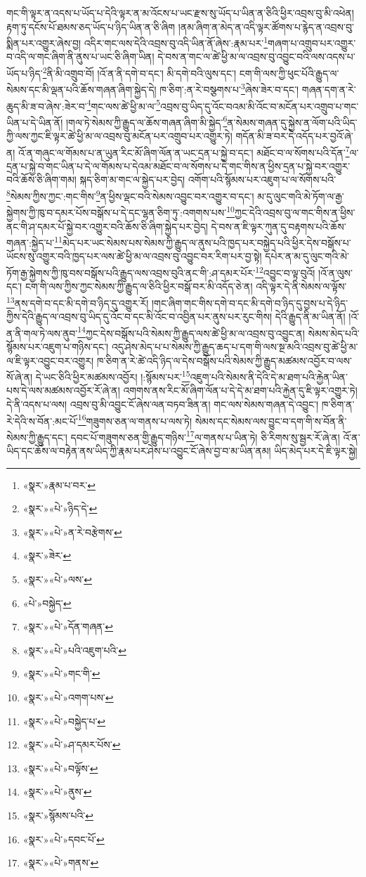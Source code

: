 གང་གི་ལྟར་ན་འདས་པ་ཡོད་པ་དེའི་ལྟར་ན་མ་འོངས་པ་ཡང་རྫས་སུ་ཡོད་པ་ཡིན་ན་ཅིའི་ཕྱིར་འབྲས་བུ་མི་འཕེན། རྟག་ཏུ་དངོས་པོ་ཐམས་ཅད་ཡོད་པ་ཉིད་ཡིན་ན་ཅི་ཞིག །ནམ་ཞིག་ན་མེད་ན་འདི་ལྟར་ཚོགས་པ་རྙེད་ན་འབྲས་བུ་སྨིན་པར་འགྱུར་ཞེས་བྱ། འདིར་གང་ལས་དེའི་འབྲས་བུ་འདི་ཡིན་ནོ་ཞེས་:རྣམ་པར་\footnote{«སྣར་»རྣམ་པ་བར་}གཞག་པ་འགྲུབ་པར་འགྱུར་བ་འདི་ལ་གང་ཞིག་ནི་ནུས་པ་ཡང་ཅི་ཞིག་ཡིན། དེ་བས་ན་གང་ལ་ཚེ་ཕྱི་མ་ལ་འབྲས་བུ་འབྱུང་བའི་ལས་འདས་པ་ཡོད་པ་ཉིད་\footnote{«སྣར་»«པེ་»ཉིད་དེ་}ནི་མི་འགྲུབ་བོ། །འོ་ན་ནི་དགེ་བ་དང་། མི་དགེ་བའི་ལུས་དང་། ངག་གི་ལས་ཀྱི་ཕུང་པོའི་རྒྱུད་ལ་སེམས་དང་མི་ལྡན་པའི་ཆོས་གཞན་ཞིག་སྐྱེད་དེ། ཁ་ཅིག་:ན་རེ་བསྩགས་པ་\footnote{«སྣར་»«པེ་»ན་རེ་བརྩེགས་}ཞེས་ཟེར་བ་དང་། གཞན་དག་ན་རེ་ཆུད་མི་ཟ་བ་ཞེས་:ཟེར་བ་\footnote{«སྣར་»ཟེར་}གང་ལས་ཚེ་ཕྱི་མ་ལ་\footnote{«སྣར་»«པེ་»ལས་}འབྲས་བུ་ཡིད་དུ་འོང་བའམ་མི་འོང་བ་མངོན་པར་འགྲུབ་པ་གང་ཡིན་པ་དེ་ཡིན་ནོ། །གལ་ཏེ་སེམས་ཀྱི་རྒྱུད་ལ་ཆོས་གཞན་ཞིག་མི་སྐྱེད་\footnote{«པེ་»བསྐྱེད་}ན་སེམས་གཞན་དུ་སྐྱེས་ན་ལོག་པའི་ཡིད་ཀྱི་ལས་ཀྱང་ཇི་ལྟར་ཚེ་ཕྱི་མ་ལ་འབྲས་བུ་མངོན་པར་འགྲུབ་པར་འགྱུར་ཏེ། གདོན་མི་ཟ་བར་དེ་འདོད་པར་བྱའོ་ཞེ་ན། འོ་ན་གཞུང་ལ་གོམས་པ་ན་ཡུན་རིང་མོ་ཞིག་ལོན་ན་ཡང་དྲན་པ་སྐྱེ་བ་དང་། མཐོང་བ་ལ་སོགས་པའི་དོན་\footnote{«སྣར་»«པེ་»དོན་གཞན་}ལ་དྲན་པ་སྐྱེ་བ་གང་ཡིན་པ་དེ་ལ་གོམས་པ་དེའམ་མཐོང་བ་ལ་སོགས་པ་དེ་གང་གིས་ན་ཕྱིས་དྲན་པ་སྐྱེ་བར་འགྱུར་བའི་ཆོས་ཅི་ཞིག་གམ། སྐད་ཅིག་མ་གང་ལ་སྐྱེད་པར་བྱེད། འགོག་པའི་སྙོམས་པར་འཇུག་པ་ལ་སོགས་པའི་\footnote{«སྣར་»«པེ་»པའི་འཇུག་པའི་}སེམས་ཀྱིས་ཀྱང་:གང་གིས་\footnote{«སྣར་»«པེ་»གང་གི་}ན་ཕྱིས་ལྡང་བའི་སེམས་འབྱུང་བར་འགྱུར་བ་དང་། མ་དུ་ལུང་གའི་མེ་ཏོག་ལ་རྒྱ་སྐྱེགས་ཀྱི་ཁུ་བ་དམར་པོས་བསྒོས་པ་དེ་དང་ལྷན་ཅིག་ཏུ་:འགགས་པས་\footnote{«སྣར་»«པེ་»འགག་པས་}ཀྱང་དེའི་འབྲས་བུ་ལ་གང་གིས་ན་ཕྱིས་ནང་གི་ཤ་དམར་པོ་སྐྱེ་བར་འགྱུར་བའི་ཆོས་ཅི་ཞིག་སྐྱེད་པར་བྱེད། དེ་བས་ན་ཇི་ལྟར་ཀུན་དུ་བརྟགས་པའི་ཆོས་གཞན་:སྐྱེད་པ་\footnote{«སྣར་»«པེ་»བསྐྱེད་པ་}མེད་པར་ཡང་སེམས་པས་སེམས་ཀྱི་རྒྱུད་ལ་ནུས་པའི་ཁྱད་པར་བསྐྱེད་པའི་ཕྱིར་དེས་བསྒོས་པ་ཡོངས་སུ་འགྱུར་བའི་ཁྱད་པར་ལས་ཚེ་ཕྱི་མ་ལ་འབྲས་བུ་འབྱུང་བར་རིག་པར་བྱ་སྟེ། དཔེར་ན་མ་དུ་ལུང་གའི་མེ་ཏོག་རྒྱ་སྐྱེགས་ཀྱི་ཁུ་བས་བསྒོས་པའི་རྒྱུད་ལས་འབྲས་བུའི་ནང་གི་:ཤ་དམར་པོར་\footnote{«སྣར་»«པེ་»ཤ་དམར་པོས་}འབྱུང་བ་ལྟ་བུའོ། །འོ་ན་ལུས་དང་། ངག་གི་ལས་ཀྱིས་ཀྱང་སེམས་ཀྱི་རྒྱུད་ལ་ཅིའི་ཕྱིར་བསྒོ་བར་མི་འདོད་ཅེ་ན། འདི་ལྟར་དེ་ནི་སེམས་ལ་ལྟོས་\footnote{«སྣར་»«པེ་»བལྟོས་}ནས་དགེ་བ་དང་མི་དགེ་བ་ཉིད་དུ་འགྱུར་རོ། །གང་ཞིག་གང་གིས་དགེ་བ་དང་མི་དགེ་བ་ཉིད་དུ་བྱས་པ་དེ་ཉིད་ཀྱིས་དེའི་རྒྱུད་ལ་འབྲས་བུ་ཡིད་དུ་འོང་བ་དང་མི་འོང་བ་འབྱིན་པར་ནུས་པར་རུང་གིས། དེའི་རྒྱུད་ནི་མ་ཡིན་ནོ། །འོ་ན་ནི་གལ་ཏེ་ལས་ནུབ་\footnote{«སྣར་»«པེ་»ནུས་}ཀྱང་དེས་བསྒོས་པའི་སེམས་ཀྱི་རྒྱུད་ལས་ཚེ་ཕྱི་མ་ལ་འབྲས་བུ་འབྱུང་ན། སེམས་མེད་པའི་སྙོམས་པར་འཇུག་པ་གཉིས་དང་། འདུ་ཤེས་མེད་པ་པ་སེམས་ཀྱི་རྒྱུད་ཆད་པ་དག་གི་ལས་སྔ་མའི་འབྲས་བུ་ཚེ་ཕྱི་མ་ལ་ཇི་ལྟར་འབྱུང་བར་འགྱུར། ཁ་ཅིག་ན་རེ་ཚེ་འདི་ཉིད་ལ་དེས་བསྒོས་པའི་སེམས་ཀྱི་རྒྱུད་མཚམས་འབྱོར་བ་ལས་སོ་ཞེ་ན། དེ་ཡང་ཅིའི་ཕྱིར་མཚམས་འབྱོར། །:སྙོམས་པར་\footnote{«སྣར་»སྙོམས་པའི་}འཇུག་པའི་སེམས་ནི་དེའི་དེ་མ་ཐག་པའི་རྐྱེན་ཡིན་པས་དེ་ལས་མཚམས་འབྱོར་རོ་ཞེ་ན། འགགས་ནས་རིང་མོ་ཞིག་ལོན་པ་དེ་དེ་མ་ཐག་པའི་རྐྱེན་དུ་ཇི་ལྟར་འགྱུར་ཏེ། དེ་ནི་འདས་པ་ལས། འབྲས་བུ་མི་འབྱུང་ངོ་ཞེས་ལན་བཏབ་ཟིན་ན། གང་ལས་སེམས་གཞན་དེ་འབྱུང་། ཁ་ཅིག་ན་རེ་དེའི་ས་བོན་:མང་པོ་\footnote{«སྣར་»«པེ་»དབང་པོ་}གཟུགས་ཅན་ལ་གནས་པ་ལས་ཏེ། སེམས་དང་སེམས་ལས་བྱུང་བ་དག་གི་ས་བོན་ནི་སེམས་ཀྱི་རྒྱུད་དང་། དབང་པོ་གཟུགས་ཅན་གྱི་རྒྱུད་གཉིས་\footnote{«སྣར་»«པེ་»གནས་}ལ་གནས་པ་ཡིན་ཏེ། ཅི་རིགས་སུ་སྦྱར་རོ་ཞེ་ན། འོ་ན་ཡིད་དང་ཆོས་ལ་བརྟེན་ནས་ཡིད་ཀྱི་རྣམ་པར་ཤེས་པ་འབྱུང་ངོ་ཞེས་བྱ་བ་མ་ཡིན་ནམ། ཡིད་མེད་པར་དེ་ཇི་ལྟར་སྐྱེ། 